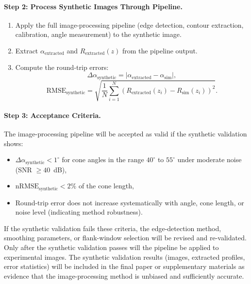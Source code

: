 \paragraph{Step 2: Process Synthetic Images Through Pipeline.}
\begin{enumerate}
    \item Apply the full image-processing pipeline (edge detection, contour extraction, calibration, angle measurement) to the synthetic image.
    \item Extract $\alpha_{\mathrm{extracted}}$ and $R_{\mathrm{extracted}}(z)$ from the pipeline output.
    \item Compute the round-trip errors:
    \begin{equation}
    \Delta\alpha_{\mathrm{synthetic}} = |\alpha_{\mathrm{extracted}} - \alpha_{\mathrm{sim}}|,
    \end{equation}
    \begin{equation}
    \mathrm{RMSE}_{\mathrm{synthetic}} = \sqrt{\frac{1}{N}\sum_{i=1}^{N}\left(R_{\mathrm{extracted}}(z_i) - R_{\mathrm{sim}}(z_i)\right)^2}.
    \end{equation}
\end{enumerate}

\paragraph{Step 3: Acceptance Criteria.}
The image-processing pipeline will be accepted as valid if the synthetic validation shows:
\begin{itemize}
    \item $\Delta\alpha_{\mathrm{synthetic}} < 1^{\circ}$ for cone angles in the range $40^{\circ}$ to $55^{\circ}$ under moderate noise (SNR $\geq 40$~dB),
    \item $\mathrm{nRMSE}_{\mathrm{synthetic}} < 2\%$ of the cone length,
    \item Round-trip error does not increase systematically with angle, cone length, or noise level (indicating method robustness).
\end{itemize}

If the synthetic validation fails these criteria, the edge-detection method, smoothing parameters, or flank-window selection will be revised and re-validated. Only after the synthetic validation passes will the pipeline be applied to experimental images. The synthetic validation results (images, extracted profiles, error statistics) will be included in the final paper or supplementary materials as evidence that the image-processing method is unbiased and sufficiently accurate.


